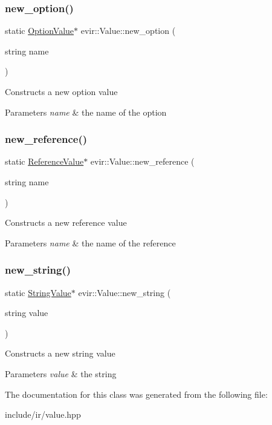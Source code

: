 \subsubsection{\texorpdfstring{new\+\_\+option()}{new\_option()}}
{\footnotesize\ttfamily static \hyperlink{classevir_1_1OptionValue}{Option\+Value}$\ast$ evir\+::\+Value\+::new\+\_\+option (\begin{DoxyParamCaption}\item[{string}]{name }\end{DoxyParamCaption})\hspace{0.3cm}{\ttfamily [static]}}

Constructs a new option value 
\begin{DoxyParams}{Parameters}
{\em name} & the name of the option \\
\hline
\end{DoxyParams}
\mbox{\label{classevir_1_1Value_a550b2d56a46a357282ad167821fedbe5}} 
\subsubsection{\texorpdfstring{new\+\_\+reference()}{new\_reference()}}
{\footnotesize\ttfamily static \hyperlink{classevir_1_1ReferenceValue}{Reference\+Value}$\ast$ evir\+::\+Value\+::new\+\_\+reference (\begin{DoxyParamCaption}\item[{string}]{name }\end{DoxyParamCaption})\hspace{0.3cm}{\ttfamily [static]}}

Constructs a new reference value 
\begin{DoxyParams}{Parameters}
{\em name} & the name of the reference \\
\hline
\end{DoxyParams}
\mbox{\label{classevir_1_1Value_a56a75d435ff168c8d3f104018f9b58a5}} 
\subsubsection{\texorpdfstring{new\+\_\+string()}{new\_string()}}
{\footnotesize\ttfamily static \hyperlink{classevir_1_1StringValue}{String\+Value}$\ast$ evir\+::\+Value\+::new\+\_\+string (\begin{DoxyParamCaption}\item[{string}]{value }\end{DoxyParamCaption})\hspace{0.3cm}{\ttfamily [static]}}

Constructs a new string value 
\begin{DoxyParams}{Parameters}
{\em value} & the string \\
\hline
\end{DoxyParams}


The documentation for this class was generated from the following file\+:\begin{DoxyCompactItemize}
\item 
include/ir/value.\+hpp\end{DoxyCompactItemize}
